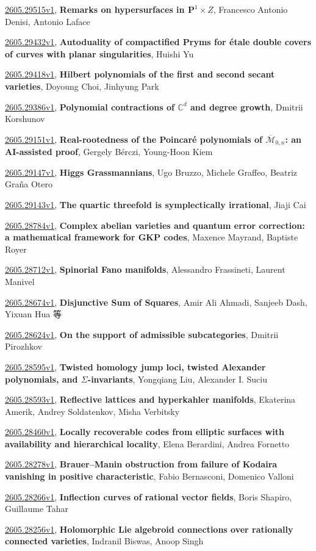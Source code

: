 \documentclass[9pt, a4paper]{article}
\theoremstyle{plain}
\theoremstyle{definition}
\theoremstyle{remark}
\newcommand{\arxiv}[3]{\href{https://arxiv.org/abs/#1}{#1}, \textbf{\textcolor{arxivblue}{#2}}, #3}
\begin{document}
\arxiv{2605.29515v1}{Remarks on hypersurfaces in $\mathbf{P}^1\times Z$}{Francesco Antonio Denisi, Antonio Laface}

\arxiv{2605.29432v1}{Autoduality of compactified Pryms for étale double covers of curves with planar singularities}{Huishi Yu}

\arxiv{2605.29418v1}{Hilbert polynomials of the first and second secant varieties}{Doyoung Choi, Jinhyung Park}

\arxiv{2605.29386v1}{Polynomial contractions of $\mathbb C^d$ and degree growth}{Dmitrii Korshunov}

\arxiv{2605.29151v1}{Real-rootedness of the Poincaré polynomials of $\overline{\mathcal M}_{0,n}$: an AI-assisted proof}{Gergely Bérczi, Young-Hoon Kiem}

\arxiv{2605.29147v1}{Higgs Grassmannians}{Ugo Bruzzo, Michele Graffeo, Beatriz Graña Otero}

\arxiv{2605.29143v1}{The quartic threefold is symplectically irrational}{Jiaji Cai}

\arxiv{2605.28784v1}{Complex abelian varieties and quantum error correction: a mathematical framework for GKP codes}{Maxence Mayrand, Baptiste Royer}

\arxiv{2605.28712v1}{Spinorial Fano manifolds}{Alessandro Frassineti, Laurent Manivel}

\arxiv{2605.28674v1}{Disjunctive Sum of Squares}{Amir Ali Ahmadi, Sanjeeb Dash, Yixuan Hua 等}

\arxiv{2605.28624v1}{On the support of admissible subcategories}{Dmitrii Pirozhkov}

\arxiv{2605.28595v1}{Twisted homology jump loci, twisted Alexander polynomials, and $Σ$-invariants}{Yongqiang Liu, Alexander I. Suciu}

\arxiv{2605.28593v1}{Reflective lattices and hyperkahler manifolds}{Ekaterina Amerik, Andrey Soldatenkov, Misha Verbitsky}

\arxiv{2605.28460v1}{Locally recoverable codes from elliptic surfaces with availability and hierarchical locality}{Elena Berardini, Andrea Fornetto}

\arxiv{2605.28278v1}{Brauer--Manin obstruction from failure of Kodaira vanishing in positive characteristic}{Fabio Bernasconi, Domenico Valloni}

\arxiv{2605.28266v1}{Inflection curves of rational vector fields}{Boris Shapiro, Guillaume Tahar}

\arxiv{2605.28256v1}{Holomorphic Lie algebroid connections over rationally connected varieties}{Indranil Biswas, Anoop Singh}
\end{document}
